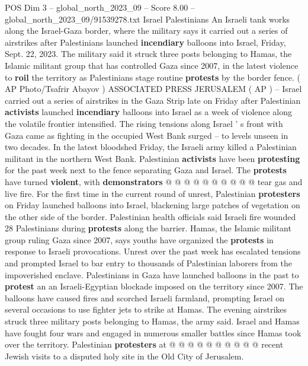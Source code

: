 \begin{textsample}{POS Dim 3 – global\_north\_2023\_09 – Score 8.00 – global\_north\_2023\_09/91539278.txt}  \label{ex:f3_pos_045}
Israel Palestinians An Israeli tank works along the Israel-Gaza border, where the military says it carried out a series of airstrikes after Palestinians launched \textbf{incendiary} balloons into Israel, Friday, Sept. 22, 2023.
The military said it struck three posts belonging to Hamas, the Islamic militant group that has controlled Gaza since 2007, in the latest violence to \textbf{roil} the territory as Palestinians stage routine \textbf{protests} by the border fence. ( AP Photo/Tsafrir Abayov ) ASSOCIATED PRESS JERUSALEM ( AP ) -- Israel carried out a series of airstrikes in the Gaza Strip late on Friday after Palestinian \textbf{activists} launched \textbf{incendiary} balloons into Israel as a week of violence along the volatile frontier intensified.
The rising tensions along Israel ' s front with Gaza came as fighting in the occupied West Bank surged -- to levels unseen in two decades.
In the latest bloodshed Friday, the Israeli army killed a Palestinian militant in the northern West Bank.
Palestinian \textbf{activists} have been \textbf{protesting} for the past week next to the fence separating Gaza and Israel.
The \textbf{protests} have turned \textbf{violent}, with \textbf{demonstrators} @ @ @ @ @ @ @ @ @ @ tear gas and live fire.
For the first time in the current round of unrest, Palestinian \textbf{protesters} on Friday launched balloons into Israel, blackening large patches of vegetation on the other side of the border.
Palestinian health officials said Israeli fire wounded 28 Palestinians during \textbf{protests} along the barrier.
Hamas, the Islamic militant group ruling Gaza since 2007, says youths have organized the \textbf{protests} in response to Israeli provocations.
Unrest over the past week has escalated tensions and prompted Israel to bar entry to thousands of Palestinian laborers from the impoverished enclave.
Palestinians in Gaza have launched balloons in the past to \textbf{protest} an an Israeli-Egyptian blockade imposed on the territory since 2007.
The balloons have caused fires and scorched Israeli farmland, prompting Israel on several occasions to use fighter jets to strike at Hamas.
The evening airstrikes struck three military posts belonging to Hamas, the army said.
Israel and Hamas have fought four wars and engaged in numerous smaller battles since Hamas took over the territory.
Palestinian \textbf{protesters} at @ @ @ @ @ @ @ @ @ @ recent Jewish visits to a disputed holy site in the Old City of Jerusalem.

\end{textsample}
